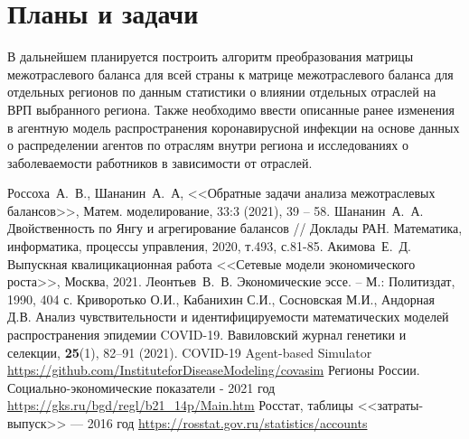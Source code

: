 \documentclass[12pt, a4paper]{article}
\begin{document}
\section{Планы и задачи}
В дальнейшем планируется построить алгоритм преобразования матрицы межотраслевого баланса для всей страны к матрице межотраслевого баланса для отдельных регионов по данным статистики о влиянии отдельных отраслей на ВРП выбранного региона.
Также необходимо ввести описанные ранее изменения в агентную модель распространения коронавирусной инфекции на основе данных о распределении агентов по отраслям внутри региона и исследованиях о заболеваемости работников в зависимости от отраслей.

\begin{thebibliography}{00}
Россоха~А.~В., Шананин~А.~А, <<Обратные задачи анализа межотраслевых балансов>>, Матем. моделирование, 33:3 (2021), 39 -- 58.
Шананин~А.~А. Двойственность по Янгу и агрегирование балансов // Доклады РАН. Математика, информатика, процессы управления, 2020, т.493, с.81-85.
Акимова~Е.~Д. Выпускная квалицикационная работа <<Сетевые модели экономического роста>>, Москва, 2021.
Леонтьев~В.~В. Экономические эссе. -- М.: Политиздат, 1990, 404 с.
 Криворотько О.И., Кабанихин С.И., Сосновская М.И., Андорная Д.В. Анализ чувствительности и идентифицируемости математических моделей распространения эпидемии COVID-19. Вавиловский журнал генетики и селекции, \textbf{25}(1), 82--91 (2021).
COVID-19 Agent-based Simulator \underline{https://github.com/InstituteforDiseaseModeling/covasim}
Регионы России. Социально-экономические показатели - 2021 год \underline{https://gks.ru/bgd/regl/b21\_14p/Main.htm}
Росстат, таблицы <<затраты-выпуск>> --- 2016 год \underline{https://rosstat.gov.ru/statistics/accounts}
\end{thebibliography}
\end{document}
